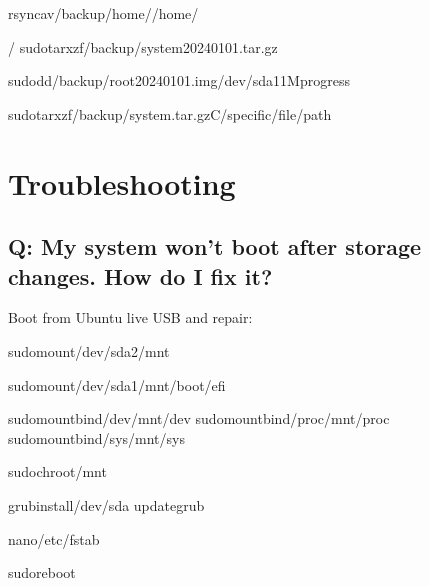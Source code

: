 \documentclass[letterpaper,10pt,english]{sphinxmanual}
\begin{document}
\begin{sphinxVerbatim}[commandchars=\\\{\}]
rsync\PYGZhy{}av/backup/home//home/

/
sudotar\PYGZhy{}xzf/backup/system\PYGZhy{}20240101.tar.gz

sudodd/backup/root\PYGZhy{}20240101.img/dev/sda11Mprogress

sudotar\PYGZhy{}xzf/backup/system.tar.gz\PYGZhy{}C/specific/file/path
\end{sphinxVerbatim}


\section{Troubleshooting}
\label{\detokenize{faq:troubleshooting}}

\subsection{Q: My system won’t boot after storage changes. How do I fix it?}
\label{\detokenize{faq:q-my-system-won-t-boot-after-storage-changes-how-do-i-fix-it}}
\sphinxAtStartPar
{} Boot from Ubuntu live USB and repair:

\begin{sphinxVerbatim}[commandchars=\\\{\}]

sudomount/dev/sda2/mnt

sudomount/dev/sda1/mnt/boot/efi

sudomount\PYGZhy{}\PYGZhy{}bind/dev/mnt/dev
sudomount\PYGZhy{}\PYGZhy{}bind/proc/mnt/proc
sudomount\PYGZhy{}\PYGZhy{}bind/sys/mnt/sys

sudochroot/mnt

grub\PYGZhy{}install/dev/sda
update\PYGZhy{}grub

nano/etc/fstab

sudoreboot
\end{sphinxVerbatim}
\end{document}
